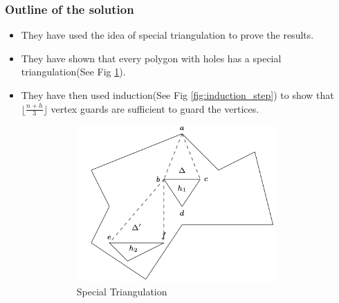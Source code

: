 \documentclass{Assignment}
\begin{document}
\subsubsection*{Outline of the solution}
\vspace{-0.3cm}
\begin{itemize}
    \itemsep-0.3em
    \item They have used the idea of special triangulation to prove the results.
    \item They have shown that every polygon with holes has a special triangulation(See Fig \ref{fig:special_triangulation}).
    \item They have then used induction(See Fig \ref{fig:induction_step}) to show that $\lfloor \frac{n+h}3 \rfloor$ vertex guards are sufficient to guard the vertices.
    \begin{figure}[H]
        \centering
        \begin{minipage}{0.45\textwidth}
            \centering
            \begin{subfigure}[b]{\textwidth}
                \centering
                \includegraphics[width=0.9\textwidth]{images/special_triangulation.png}
                \caption{Special Triangulation}
                \label{fig:special_triangulation}
            \end{subfigure}
        \end{minipage}
        \hfill
        \begin{minipage}{0.45\textwidth}
            \centering
            \begin{subfigure}[b]{\textwidth}
                \centering

\end{subfigure}
\end{minipage}
\end{figure}
\end{itemize}
\end{document}

